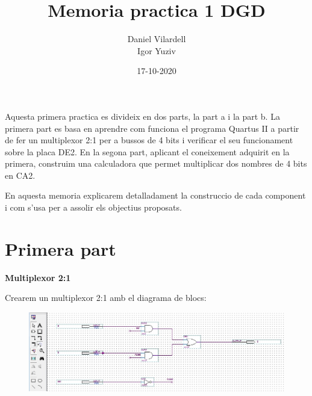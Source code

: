 \documentclass[12pt, a4papre]{article}
\author{Daniel Vilardell\\
	   Igor Yuziv}
\title{Memoria practica 1 DGD}
\date{17-10-2020}
\begin{document}
	\maketitle
	Aquesta primera practica es divideix en dos parts, la part a i la part b. La primera part es basa en aprendre com funciona el programa Quartus II a partir de fer un multiplexor  2:1 per a bussos de 4 bits i verificar el seu funcionament sobre la placa DE2. En la segona part, aplicant el coneixement adquirit en la primera, construim una calculadora que permet multiplicar dos nombres de 4 bits en CA2.
	
	En aquesta memoria explicarem detalladament la construccio de cada component i com s'usa per a assolir els objectius proposats.

	\newpage
	\section{Primera part}
	\textbf{\large{Multiplexor 2:1}}
	
	Crearem un multiplexor 2:1 amb el diagrama de blocs:
	\begin{figure}[H]
		\begin{center}
		\includegraphics[width=150mm]{multiplexor2_1.jpeg}
		\end{center}
	\end{figure}
	
\end{document}
